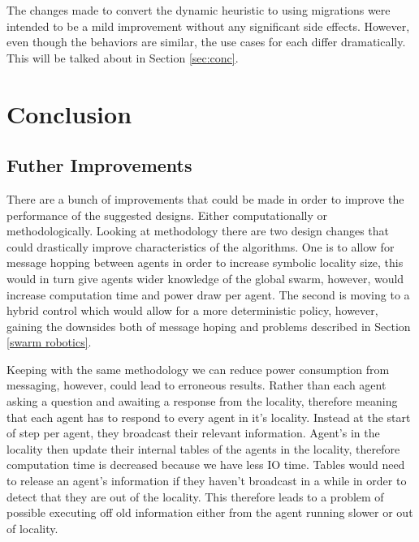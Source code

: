 \documentclass{UoYCSproject}
\begin{document}
The changes made to convert the dynamic heuristic to using migrations were intended to be a mild improvement without any significant side effects. 
However, even though the behaviors are similar, the use cases for each differ dramatically. 
This will be talked about in Section \ref{sec:conc}.


\chapter{Conclusion}
\label{cha:conclusion}

\section{Futher Improvements}
\label{sec:further}

There are a bunch of improvements that could be made in order to improve the performance of the suggested designs. 
Either computationally or methodologically.
Looking at methodology there are two design changes that could drastically improve characteristics of the algorithms. 
One is to allow for message hopping between agents in order to increase symbolic locality size, this would in turn give agents wider knowledge of the global swarm, however, would increase computation time and power draw per agent. 
The second is moving to a hybrid control which would allow for a more deterministic policy, however, gaining the downsides both of message hoping and problems described in Section \ref{swarm robotics}.

Keeping with the same methodology we can reduce power consumption from messaging, however, could lead to erroneous results. 
Rather than each agent asking a question and awaiting a response from the locality, therefore meaning that each agent has to respond to every agent in it’s locality. 
Instead at the start of step per agent, they broadcast their relevant information. 
Agent’s in the locality then update their internal tables of the agents in the locality, therefore computation time is decreased because we have less IO time. 
Tables would need to release an agent's information if they haven’t broadcast in a while in order to detect that they are out of the locality. 
This therefore leads to a problem of possible executing off old information either from the agent running slower or out of locality.
\end{document}
